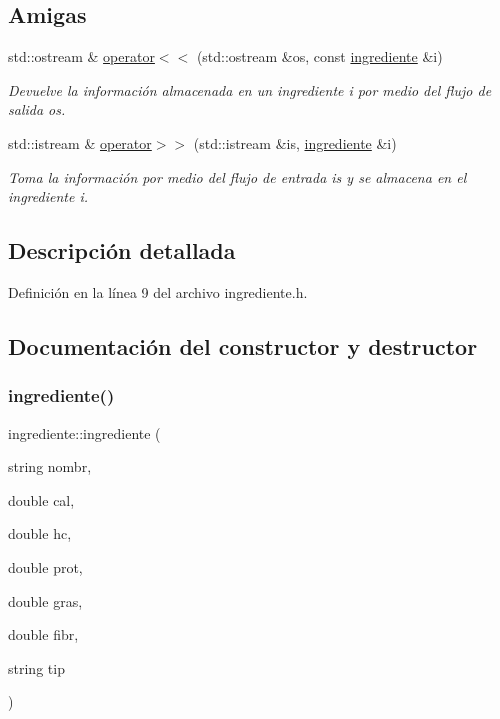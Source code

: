 \subsection*{Amigas}
\begin{DoxyCompactItemize}
\item 
std\+::ostream \& \hyperlink{classingrediente_a5049e635051bc3b2ff1c215fc4e2638a}{operator$<$$<$} (std\+::ostream \&os, const \hyperlink{classingrediente}{ingrediente} \&i)
\begin{DoxyCompactList}\small\item\em Devuelve la información almacenada en un ingrediente i por medio del flujo de salida os. \end{DoxyCompactList}\item 
std\+::istream \& \hyperlink{classingrediente_a5312eddb4e806d73874b710038bc3f52}{operator$>$$>$} (std\+::istream \&is, \hyperlink{classingrediente}{ingrediente} \&i)
\begin{DoxyCompactList}\small\item\em Toma la información por medio del flujo de entrada is y se almacena en el ingrediente i. \end{DoxyCompactList}\end{DoxyCompactItemize}


\subsection{Descripción detallada}


Definición en la línea 9 del archivo ingrediente.\+h.



\subsection{Documentación del constructor y destructor}
\mbox{\label{classingrediente_aca95519106de3689d8b4eeb6278aa77d}} 
\subsubsection{\texorpdfstring{ingrediente()}{ingrediente()}}
{\footnotesize\ttfamily ingrediente\+::ingrediente (\begin{DoxyParamCaption}\item[{string}]{nombr,  }\item[{double}]{cal,  }\item[{double}]{hc,  }\item[{double}]{prot,  }\item[{double}]{gras,  }\item[{double}]{fibr,  }\item[{string}]{tip }\end{DoxyParamCaption})}



